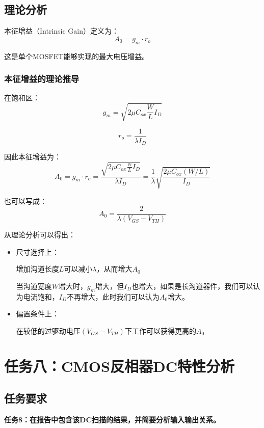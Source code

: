 \documentclass[UTF8,12pt,a4paper]{ctexart}
\begin{document}
\subsection{理论分析}
本征增益（Intrinsic Gain）定义为：
\begin{equation}
A_0 = g_m \cdot r_o
\end{equation}

这是单个MOSFET能够实现的最大电压增益。

\subsubsection{本征增益的理论推导}
在饱和区：
\begin{equation}
g_m = \sqrt{2\mu C_{ox}\frac{W}{L}I_D}
\end{equation}

\begin{equation}
r_o = \frac{1}{\lambda I_D}
\end{equation}

因此本征增益为：
\begin{equation}
A_0 = g_m \cdot r_o = \frac{\sqrt{2\mu C_{ox}\frac{W}{L}I_D}}{\lambda I_D} = \frac{1}{\lambda}\sqrt{\frac{2\mu C_{ox}(W/L)}{I_D}}
\end{equation}

也可以写成：
\begin{equation}
A_0 = \frac{2}{\lambda(V_{GS}-V_{TH})}
\end{equation}

从理论分析可以得出：
\begin{itemize}
\item 尺寸选择上：

增加沟道长度$L$可以减小$\lambda$，从而增大$A_0$

当沟道宽度$W$增大时，$g_m$增大，但$I_D$也增大，如果是长沟道器件，我们可以认为电流饱和，$I_D$不再增大，此时我们可以认为$A_0$增大。

\item 偏置条件上：

在较低的过驱动电压$(V_{GS}-V_{TH})$下工作可以获得更高的$A_0$
\end{itemize}


\newpage
\section{任务八：CMOS反相器DC特性分析}

\subsection{任务要求}
\textbf{任务8：在报告中包含该DC扫描的结果，并简要分析输入输出关系。}
\end{document}
